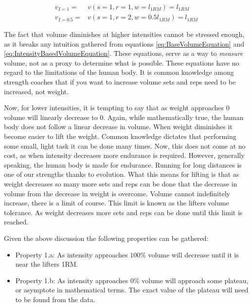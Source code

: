 \begin{subequations}
    \begin{align}
        \label{eq:VolumeWithDiffereingIntensities1}
        v_{I=1}=&v(s=1,r=1,w=l_{1RM})=l_{1RM} \\
        \label{eq:VolumeWithDiffereingIntensities2}
        v_{I=0.5}=&v(s=1,r=2,w=0.5l_{1RM})=l_{1RM}
    \end{align}
\end{subequations}

The fact that volume diminishes at higher intensities cannot be stressed enough, as it breaks any intuition gathered from equations \ref{eq:BaseVolumeEquation} and \ref{eq:IntensityBasedVolumeEquation}. These equations, serve as a way to \textit{measure} volume, not as a proxy to determine what is possible. These equations have no regard to the limitations of the human body. It is common knowledge among strength coaches that if you want to increase volume sets and reps need to be increased, not weight.

Now, for lower intensities, it is tempting to say that as weight approaches $0$ volume will linearly decrease to $0$. Again, while mathematically true, the human body does not follow a linear decrease in volume. When weight diminishes it become easier to lift the weight. Common knowledge dictates that performing some small, light task it can be done many times. Now, this does not come at no cost, as when intensity decreases more endurance is required. However, generally speaking, the human body is made for endurance. Running for long distances is one of our strengths thanks to evolution. What this means for lifting is that as weight decreases so many more sets and reps can be done that the decrease in volume from the decrease in weight is overcome. Volume cannot indefinitely increase, there is a limit of course. This limit is known as the lifters volume tolerance. As weight decreases more sets and reps can be done until this limit is reached.

Given the above discussion the following properties can be gathered:

\begin{itemize}
	\item Property 1.a:  As intensity approaches $100\%$  volume will decrease until it is near the lifters 1RM.
	\item Property 1.b: As intensity approaches $0\%$ volume will approach some plateau, or asymptote in mathematical terms. The exact value of the plateau will need to be found from the data.
\end{itemize}

